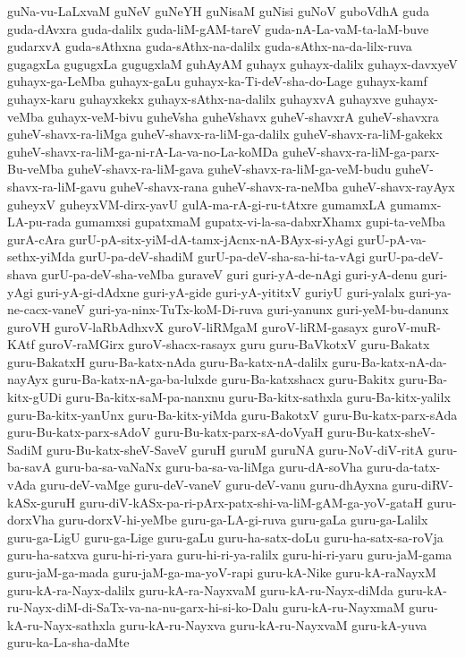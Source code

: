 {guNa-vu-LaLxvaM
guNeV
guNeYH
guNisaM
guNisi
guNoV
guboVdhA
guda
guda-dAvxra
guda-dalilx
guda-liM-gAM-tareV
guda-nA-La-vaM-ta-laM-buve
gudarxvA
guda-sAthxna
guda-sAthx-na-dalilx
guda-sAthx-na-da-lilx-ruva
gugagxLa
gugugxLa
gugugxlaM
guhAyAM
guhayx
guhayx-dalilx
guhayx-davxyeV
guhayx-ga-LeMba
guhayx-gaLu
guhayx-ka-Ti-deV-sha-do-Lage
guhayx-kamf
guhayx-karu
guhayxkekx
guhayx-sAthx-na-dalilx
guhayxvA
guhayxve
guhayx-veMba
guhayx-veM-bivu
guheVsha
guheVshavx
guheV-shavxrA
guheV-shavxra
guheV-shavx-ra-liMga
guheV-shavx-ra-liM-ga-dalilx
guheV-shavx-ra-liM-gakekx
guheV-shavx-ra-liM-ga-ni-rA-La-va-no-La-koMDa
guheV-shavx-ra-liM-ga-parx-Bu-veMba
guheV-shavx-ra-liM-gava
guheV-shavx-ra-liM-ga-veM-budu
guheV-shavx-ra-liM-gavu
guheV-shavx-rana
guheV-shavx-ra-neMba
guheV-shavx-rayAyx
guheyxV
guheyxVM-dirx-yavU
gulA-ma-rA-gi-ru-tAtxre
gumamxLA
gumamx-LA-pu-rada
gumamxsi
gupatxmaM
gupatx-vi-la-sa-dabxrXhamx
gupi-ta-veMba
gurA-cAra
gurU-pA-sitx-yiM-dA-tamx-jAcnx-nA-BAyx-si-yAgi
gurU-pA-va-sethx-yiMda
gurU-pa-deV-shadiM
gurU-pa-deV-sha-sa-hi-ta-vAgi
gurU-pa-deV-shava
gurU-pa-deV-sha-veMba
guraveV
guri
guri-yA-de-nAgi
guri-yA-denu
guri-yAgi
guri-yA-gi-dAdxne
guri-yA-gide
guri-yA-yititxV
guriyU
guri-yalalx
guri-ya-ne-cacx-vaneV
guri-ya-ninx-TuTx-koM-Di-ruva
guri-yanunx
guri-yeM-bu-danunx
guroVH
guroV-laRbAdhxvX
guroV-liRMgaM
guroV-liRM-gasayx
guroV-muR-KAtf
guroV-raMGirx
guroV-shacx-rasayx
guru
guru-BaVkotxV
guru-Bakatx
guru-BakatxH
guru-Ba-katx-nAda
guru-Ba-katx-nA-dalilx
guru-Ba-katx-nA-da-nayAyx
guru-Ba-katx-nA-ga-ba-lulxde
guru-Ba-katxshacx
guru-Bakitx
guru-Ba-kitx-gUDi
guru-Ba-kitx-saM-pa-nanxnu
guru-Ba-kitx-sathxla
guru-Ba-kitx-yalilx
guru-Ba-kitx-yanUnx
guru-Ba-kitx-yiMda
guru-BakotxV
guru-Bu-katx-parx-sAda
guru-Bu-katx-parx-sAdoV
guru-Bu-katx-parx-sA-doVyaH
guru-Bu-katx-sheV-SadiM
guru-Bu-katx-sheV-SaveV
guruH
guruM
guruNA
guru-NoV-diV-ritA
guru-ba-savA
guru-ba-sa-vaNaNx
guru-ba-sa-va-liMga
guru-dA-soVha
guru-da-tatx-vAda
guru-deV-vaMge
guru-deV-vaneV
guru-deV-vanu
guru-dhAyxna
guru-diRV-kASx-guruH
guru-diV-kASx-pa-ri-pArx-patx-shi-va-liM-gAM-ga-yoV-gataH
guru-dorxVha
guru-dorxV-hi-yeMbe
guru-ga-LA-gi-ruva
guru-gaLa
guru-ga-Lalilx
guru-ga-LigU
guru-ga-Lige
guru-gaLu
guru-ha-satx-doLu
guru-ha-satx-sa-roVja
guru-ha-satxva
guru-hi-ri-yara
guru-hi-ri-ya-ralilx
guru-hi-ri-yaru
guru-jaM-gama
guru-jaM-ga-mada
guru-jaM-ga-ma-yoV-rapi
guru-kA-Nike
guru-kA-raNayxM
guru-kA-ra-Nayx-dalilx
guru-kA-ra-NayxvaM
guru-kA-ru-Nayx-diMda
guru-kA-ru-Nayx-diM-di-SaTx-va-na-nu-garx-hi-si-ko-Dalu
guru-kA-ru-NayxmaM
guru-kA-ru-Nayx-sathxla
guru-kA-ru-Nayxva
guru-kA-ru-NayxvaM
guru-kA-yuva
guru-ka-La-sha-daMte
}
